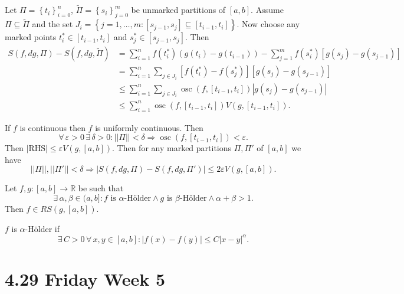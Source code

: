 \documentclass{notes}
\begin{document}
\newpage

\begin{prf}
  Let $\Pi = \left \{ t_i \right \}_{i = 0}^n$, $\tilde \Pi = \left \{ s_i \right \}_{j = 0}^m$ be unmarked partitions of $[a, b]$.
  Assume $\Pi \subseteq \tilde \Pi$ and the set $J_i = \left \{ j = 1, \dots, m : [s_{j - 1}, s_j] \subseteq [t_{i - 1}, t_i] \right \}$.
  Now choose any marked points $t^*_i \in [t_{i - 1}, t_i]$ and $s^*_j \in [s_{j - 1}, s_j]$.
  Then 
  \begin{align*}
    S(f, dg, \Pi) - S(f, dg, \tilde \Pi) &= \sum_{i = 1}^n f(t^*_i) (g(t_i) - g(t_{i - 1})) - \sum_{j = 1}^m f(s^*_i) [g(s_j) - g(s_{j - 1})] \\ 
    &= \sum_{i = 1}^n \sum_{j \in J_i} [f(t^*_i) - f(s^*_j)] [g(s_j) - g(s_{j - 1})] \\ 
    &\leq \sum_{i = 1}^n \sum_{j \in J_i} \operatorname{osc}(f, [t_{i - 1}, t_i]) \left | g(s_j) - g(s_{j - 1}) \right | \\ 
    &\leq \sum_{i = 1}^n \operatorname{osc}(f, [t_{i - 1}, t_i]) V(g, [t_{i - 1}, t_i]).
  \end{align*}
  
  If $f$ is continuous then $f$ is uniformly continuous.
  Then 
  \[
    \forall \, \varepsilon > 0 \, \exists \, \delta > 0: ||\Pi|| < \delta \Rightarrow \operatorname{osc}(f, [t_{i - 1}, t_i]) < \varepsilon.
  \]
  Then $\left | \text{RHS} \right | \leq \varepsilon V(g, [a, b])$.
  Then for any marked partitions $\Pi, \Pi'$ of $[a, b]$ we have 
  \[
    ||\Pi||, ||\Pi'|| < \delta \Rightarrow \left | S(f, dg, \Pi) - S(f, dg, \Pi') \right | \leq 2 \varepsilon V(g, [a, b]).
  \]
\end{prf}

\begin{thm}
  Let $f, g \colon [a, b] \to \mathbb R$ be such that 
  \[
    \exists \, \alpha, \beta \in (a, b]: \text{$f$ is $\alpha$-Hölder} \land \text{$g$ is $\beta$-Hölder} \land \alpha + \beta > 1.
  \]
  Then $f \in RS(g, [a, b])$.
  
  \begin{note}
    $f$ is $\alpha$-Hölder if 
    \[
      \exists \, C > 0 \, \forall \, x, y \in [a, b]: \left | f(x) - f(y) \right | \leq C \left | x - y \right |^\alpha.
    \]
  \end{note}
\end{thm}

\newpage

\section{4.29 Friday Week 5}
\end{document}
